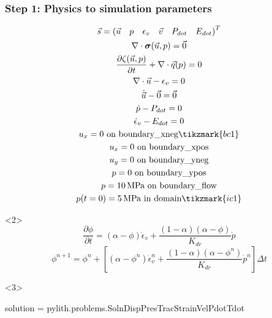 \documentclass[aspectratio=169]{beamer}
\begin{document}
\begin{frame}[t,fragile]
  \frametitle{Step 1: Physics to simulation parameters}
  \summary{}

  \begin{minipage}[t]{0.3\textwidth}
    {\scriptsize
    \begin{gather*}
        \vec{s} = \left(\vec{u} \quad p \quad \epsilon_v \quad \vec{v} \quad P_{dot} \quad E_{dot}\right)^T \\
        \nabla \cdot \boldsymbol{\sigma}(\vec{u},p) = \vec{0} \\
        \frac{\partial \zeta(\vec{u},p)}{\partial t} + \nabla \cdot \vec{q}(p) = 0 \\
        \nabla \cdot \vec{u} - \epsilon_{v} = 0 \\
        \dot{\vec{u}} - \vec{0} = \vec{0} \\
        \dot{p} - P_{dot} = 0 \\
        \dot{\epsilon}_{v} - E_{dot} = 0 \\
        u_x = 0 \text{ on boundary\_xneg} \tikzmark{bc1}\\
        u_x = 0 \text{ on boundary\_xpos} \\
        u_y = 0 \text{ on boundary\_yneg} \\
        p = 0 \text{ on boundary\_ypos} \\
        p = 10 \text{\,MPa on boundary\_flow} \\
        p(t=0) = 5 \text{\,MPa in domain} \tikzmark{ic1}
    \end{gather*}}
  \end{minipage}
  \hfill
  \begin{minipage}[t]{0.67\textwidth}
    \begin{onlyenv}<2>
      \begin{equation*}
        \frac{\partial \phi}{\partial t} = \left(\alpha - \phi\right) \dot{\epsilon}_{v} + \frac{\left(1 - \alpha\right)\left(\alpha - \phi\right)}{K_{dr}} \dot{p}
      \end{equation*}
      \begin{equation*}
        \phi^{n+1} =  \phi^{n} + \left[\left(\alpha - \phi^{n}\right) \dot{\epsilon}^{n}_{v} + \frac{\left(1 - \alpha\right)\left(\alpha - \phi^{n} \right)}{K_{dr}} \dot{p}^{n}\right] \Delta t
      \end{equation*}
    \end{onlyenv}    
    \begin{onlyenv}<3>
      \begin{cfgcode}
        solution = pylith.problems.SolnDispPresTracStrainVelPdotTdot


\end{cfgcode}
\end{onlyenv}
\end{minipage}
\end{frame}
\end{document}
